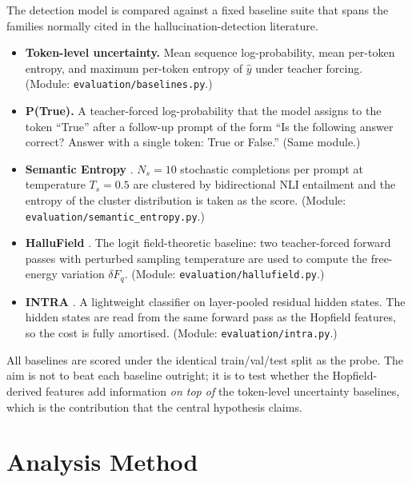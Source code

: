 The detection model is compared against a fixed baseline suite that
spans the families normally cited in the hallucination-detection
literature.

\begin{itemize}[leftmargin=*]
    \item \textbf{Token-level uncertainty.} Mean sequence log-probability,
          mean per-token entropy, and maximum per-token entropy of
          $\hat{y}$ under teacher forcing.
          (Module: \texttt{evaluation/baselines.py}.)
    \item \textbf{P(True).} A teacher-forced log-probability that the
          model assigns to the token ``True'' after a follow-up prompt of
          the form ``Is the following answer correct? Answer with a single
          token: True or False.''
          (Same module.)
    \item \textbf{Semantic Entropy} \citep{farquhar2024detecting}.
          $N_s = 10$ stochastic completions per prompt at temperature
          $T_s = 0.5$ are clustered by bidirectional NLI entailment and
          the entropy of the cluster distribution is taken as the score.
          (Module: \texttt{evaluation/semantic\_entropy.py}.)
    \item \textbf{HalluField} \citep{vu2025hallufield}. The logit
          field-theoretic baseline: two teacher-forced forward passes
          with perturbed sampling temperature are used to compute the
          free-energy variation $\delta F_q$.
          (Module: \texttt{evaluation/hallufield.py}.)
    \item \textbf{INTRA} \citep{vazhentsev2026leveraging}. A lightweight
          classifier on layer-pooled residual hidden states. The hidden
          states are read from the same forward pass as the Hopfield
          features, so the cost is fully amortised.
          (Module: \texttt{evaluation/intra.py}.)
\end{itemize}

All baselines are scored under the identical train/val/test split as the
probe. The aim is not to beat each baseline outright; it is to test
whether the Hopfield-derived features add information \emph{on top of}
the token-level uncertainty baselines, which is the contribution that
the central hypothesis claims.

\section{Analysis Method}
\label{sec:analysis_method}

